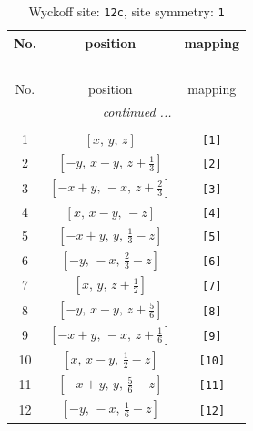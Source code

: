 \documentclass[fleqn,8pt]{jsarticle}
\begin{document}
\begin{longtable}{ccc}
\caption{Wyckoff site: {\tt 12c}, site symmetry: {\tt 1}}
 \\
 \hline \hline
No. & position & mapping \\ \hline \endfirsthead

\multicolumn{2}{l}{\tablename\ \thetable{}} \\
 \hline \hline
No. & position & mapping \\ \hline \endhead

 \hline \hline
\multicolumn{2}{r}{\footnotesize\it continued ...} \\ \endfoot

 \hline \hline
\multicolumn{2}{r}{} \\ \endlastfoot

1 & $\left[ x,\, y,\, z \right]$ & {\tt [1]} \\ \hline
2 & $\left[ - y,\, x - y,\, z + \frac{1}{3} \right]$ & {\tt [2]} \\ \hline
3 & $\left[ - x + y,\, - x,\, z + \frac{2}{3} \right]$ & {\tt [3]} \\ \hline
4 & $\left[ x,\, x - y,\, - z \right]$ & {\tt [4]} \\ \hline
5 & $\left[ - x + y,\, y,\, \frac{1}{3} - z \right]$ & {\tt [5]} \\ \hline
6 & $\left[ - y,\, - x,\, \frac{2}{3} - z \right]$ & {\tt [6]} \\ \hline
7 & $\left[ x,\, y,\, z + \frac{1}{2} \right]$ & {\tt [7]} \\ \hline
8 & $\left[ - y,\, x - y,\, z + \frac{5}{6} \right]$ & {\tt [8]} \\ \hline
9 & $\left[ - x + y,\, - x,\, z + \frac{1}{6} \right]$ & {\tt [9]} \\ \hline
10 & $\left[ x,\, x - y,\, \frac{1}{2} - z \right]$ & {\tt [10]} \\ \hline
11 & $\left[ - x + y,\, y,\, \frac{5}{6} - z \right]$ & {\tt [11]} \\ \hline
12 & $\left[ - y,\, - x,\, \frac{1}{6} - z \right]$ & {\tt [12]} \\
\end{longtable}
\end{document}
